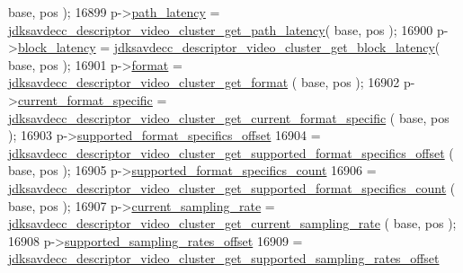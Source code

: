 \begin{DoxyCode}
       base, pos );
16899         p->\hyperlink{structjdksavdecc__descriptor__video__unit__cluster_a5527ea1fa3f885e9d2264e450e1635fa}{path\_latency} = 
      \hyperlink{group__descriptor__video__cluster_ga3dc3639500193a58df094826527e0307}{jdksavdecc\_descriptor\_video\_cluster\_get\_path\_latency}( 
      base, pos );
16900         p->\hyperlink{structjdksavdecc__descriptor__video__unit__cluster_ae2e9f0088d5e900b610d1b2818dfc559}{block\_latency} = 
      \hyperlink{group__descriptor__video__cluster_ga6dc5ad183a8c8e0d52c7f656bfdef4a3}{jdksavdecc\_descriptor\_video\_cluster\_get\_block\_latency}(
       base, pos );
16901         p->\hyperlink{structjdksavdecc__descriptor__video__unit__cluster_a7864fd50d470f893524181b4a59d9828}{format} = \hyperlink{group__descriptor__video__cluster_ga116bf799b564ad0a9373d2758c02c970}{jdksavdecc\_descriptor\_video\_cluster\_get\_format}
      ( base, pos );
16902         p->\hyperlink{structjdksavdecc__descriptor__video__unit__cluster_a63f65131cfbe03bc516880e297be3181}{current\_format\_specific} = 
      \hyperlink{group__descriptor__video__cluster_gab7ec9de12822574a1ce9fc412a95d408}{jdksavdecc\_descriptor\_video\_cluster\_get\_current\_format\_specific}
      ( base, pos );
16903         p->\hyperlink{structjdksavdecc__descriptor__video__unit__cluster_a4f27294c624ea8ade0df5e53def07e00}{supported\_format\_specifics\_offset}
16904             = 
      \hyperlink{group__descriptor__video__cluster_ga445ef3ac60b388432047f1932fc03b15}{jdksavdecc\_descriptor\_video\_cluster\_get\_supported\_format\_specifics\_offset}
      ( base, pos );
16905         p->\hyperlink{structjdksavdecc__descriptor__video__unit__cluster_a3fcf29c535a8155899a04ec7d49fed92}{supported\_format\_specifics\_count}
16906             = 
      \hyperlink{group__descriptor__video__cluster_ga9881306b0820e456f489b07af0b41db8}{jdksavdecc\_descriptor\_video\_cluster\_get\_supported\_format\_specifics\_count}
      ( base, pos );
16907         p->\hyperlink{structjdksavdecc__descriptor__video__unit__cluster_a081e14c5c832a659daf22003ed8e918d}{current\_sampling\_rate} = 
      \hyperlink{group__descriptor__video__cluster_ga4301969a1823c18cebc2c6ccafbe9990}{jdksavdecc\_descriptor\_video\_cluster\_get\_current\_sampling\_rate}
      ( base, pos );
16908         p->\hyperlink{structjdksavdecc__descriptor__video__unit__cluster_a07e4720cf58229a78c3c0939837b6228}{supported\_sampling\_rates\_offset}
16909             = 
      \hyperlink{group__descriptor__video__cluster_ga0abc0c7b8f8b375494b25d1fd2fc985d}{jdksavdecc\_descriptor\_video\_cluster\_get\_supported\_sampling\_rates\_offset}

\end{DoxyCode}
